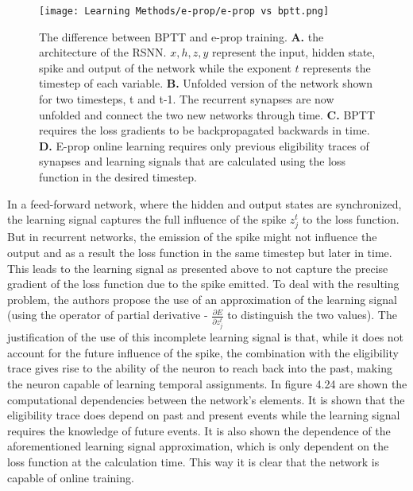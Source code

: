 \documentclass[12pt]{report}
\begin{document}
\begin{figure}[htp]
    \centering
    \texttt{[image: Learning Methods/e-prop/e-prop vs bptt.png]}
    \caption{\footnotesize The difference between BPTT and e-prop training. \textbf{A.} the architecture of the RSNN. \(x, h, z, y\) represent the input, hidden state, spike and output of the network while the exponent \(t\) represents the timestep of each variable. \textbf{B.} Unfolded version of the network shown for two timesteps, t and t-1. The recurrent synapses are now unfolded and connect the two new networks through time. \textbf{C.} BPTT requires the loss gradients to be backpropagated backwards in time. \textbf{D.} E-prop online learning requires only previous eligibility traces of synapses and learning signals that are calculated using the loss function in the desired timestep.
    \label{fig:readout}}
\end{figure}

In a feed-forward network, where the hidden and output states are synchronized, the learning signal captures the full influence of the spike \(z_j^t\) to the loss function. But in recurrent networks, the emission of the spike might not influence the output and as a result the loss function in the same timestep but later in time. This leads to the learning signal as presented above to not capture the precise gradient of the loss function due to the spike emitted. To deal with the resulting problem, the authors propose the use of an approximation of the learning signal (using the operator of partial derivative - \(\frac{\partial E}{\partial z_{j}^{t}}\) to distinguish the two values). The justification of the use of this incomplete learning signal is that, while it does not account for the future influence of the spike, the combination with the eligibility trace gives rise to the ability of the neuron to reach back into the past, making the neuron capable of learning temporal assignments. In figure 4.24 are shown the computational dependencies between the network's elements. It is shown that the eligibility trace does depend on past and present events while the learning signal requires the knowledge of future events. It is also shown the dependence of the aforementioned learning signal approximation, which is only dependent on the loss function at the calculation time. This way it is clear that the network is capable of online training.
\end{document}
